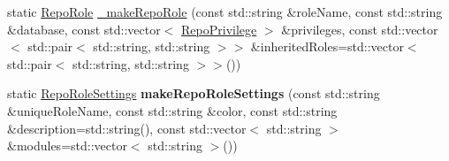\begin{DoxyCompactItemize}
\item 
static \hyperlink{classrepo_1_1core_1_1model_1_1_repo_role}{Repo\+Role} \hyperlink{classrepo_1_1core_1_1model_1_1_repo_b_s_o_n_factory_a8dec46fa7f8dee1265f456d48e0e84e3}{\+\_\+make\+Repo\+Role} (const std\+::string \&role\+Name, const std\+::string \&database, const std\+::vector$<$ \hyperlink{structrepo_1_1core_1_1model_1_1_repo_privilege}{Repo\+Privilege} $>$ \&privileges, const std\+::vector$<$ std\+::pair$<$ std\+::string, std\+::string $>$$>$ \&inherited\+Roles=std\+::vector$<$ std\+::pair$<$ std\+::string, std\+::string $>$$>$())
\item 
\hypertarget{classrepo_1_1core_1_1model_1_1_repo_b_s_o_n_factory_a174cd12a456e0e16bba87c3fd0f44a3b}{}static \hyperlink{classrepo_1_1core_1_1model_1_1_repo_role_settings}{Repo\+Role\+Settings} {\bfseries make\+Repo\+Role\+Settings} (const std\+::string \&unique\+Role\+Name, const std\+::string \&color, const std\+::string \&description=std\+::string(), const std\+::vector$<$ std\+::string $>$ \&modules=std\+::vector$<$ std\+::string $>$())\label{classrepo_1_1core_1_1model_1_1_repo_b_s_o_n_factory_a174cd12a456e0e16bba87c3fd0f44a3b}


\end{DoxyCompactItemize}
